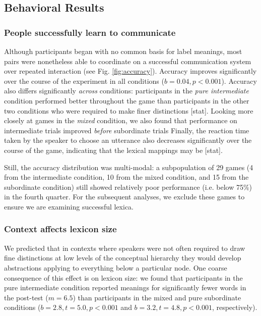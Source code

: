 \documentclass[10pt,letterpaper]{article}
\begin{document}
\subsection{Behavioral Results}

\subsubsection{People successfully learn to communicate}

Although participants began with no common basis for label meanings, most pairs were nonetheless able to coordinate on a successful communication system over repeated interaction (see Fig. \ref{fig:accuracy}). 
Accuracy improves significantly over the course of the experiment in all conditions ($b = 0.04, p < 0.001$). 
Accuracy also differs significantly \emph{across} conditions: participants in the \emph{pure intermediate} condition performed better throughout the game than participants in the other two conditions who were required to make finer distinctions [stat]. 
Looking more closely at games in the \emph{mixed} condition, we also found that performance on intermediate trials improved \emph{before} subordinate trials %
Finally, the reaction time taken by the speaker to choose an utterance also decreases significantly over the course of the game, indicating that the lexical mappings may be  [stat]. 

Still, the accuracy distribution was multi-modal: a subpopulation of 29 games (4 from the intermediate condition, 10 from the mixed condition, and 15 from the subordinate condition) still showed relatively poor  performance (i.e. below 75\%) in the fourth quarter. For the subsequent analyses, we exclude these games to ensure we are examining successful lexica.

\subsubsection{Context affects lexicon size}

We predicted that in contexts where speakers were not often required to draw fine distinctions at low levels of the conceptual hierarchy they would develop abstractions applying to everything below a particular node. One coarse consequence of this effect is on lexicon size: we found that participants in the pure intermediate condition reported meanings for significantly fewer words in the post-test ($m = 6.5$) than participants in the mixed and pure subordinate conditions ($b = 2.8, t = 5.0, p <0.001$ and $b = 3.2, t = 4.8, p < 0.001$, respectively). 
\end{document}
